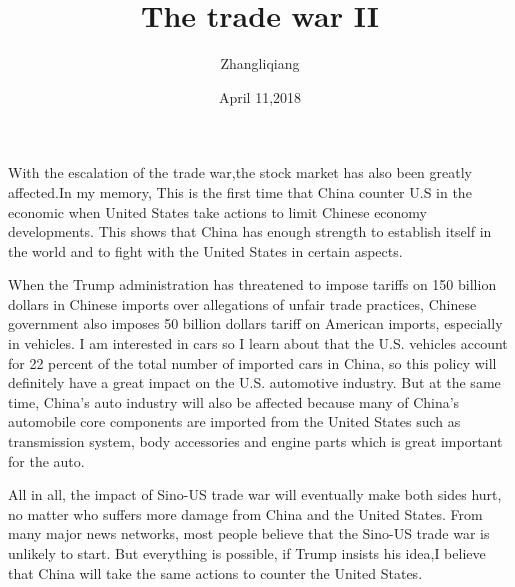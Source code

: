 \documentclass{article}
\author{Zhangliqiang}
\date{April 11,2018}
\title{The trade war II}
\begin{document}
\maketitle

With the escalation of the trade war,the stock market has also been greatly affected.In my memory, This is the first time that China counter U.S in the economic when United States take actions to limit Chinese economy developments. This shows that China has enough strength to establish itself in the world and to fight with the United States in certain aspects. 

When the Trump administration has threatened to impose tariffs on 150 billion dollars in Chinese imports over allegations of unfair trade practices, Chinese government also imposes 50 billion dollars tariff on American imports, especially in vehicles. I am interested in cars so I learn about that the U.S. vehicles account for 22 percent of the total number of imported cars in China, so this policy will definitely have a great impact on the U.S. automotive industry. But at the same time, China's auto industry will also be affected because many of China's automobile core components are imported from the United States such as transmission system, body accessories and engine parts which is great important for the auto.

All in all, the impact of Sino-US trade war will eventually make both sides hurt, no matter who suffers more damage from China and the United States. From many major news networks, most people believe that the Sino-US trade war is unlikely to start. But everything is possible, if Trump insists his idea,I believe that China will take the same actions to counter the United States.
\end{document}
